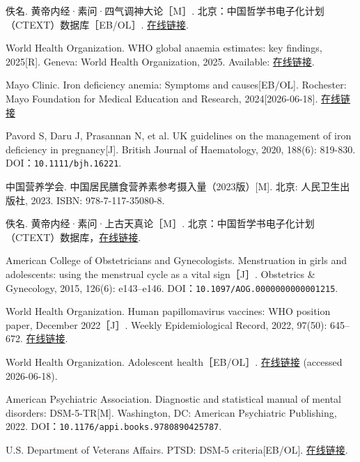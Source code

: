 \begin{enumerate}[label={[Q\arabic*]},leftmargin=*]
  \item 佚名. 黄帝内经·素问·四气调神大论［M］. 北京：中国哲学书电子化计划（CTEXT）数据库［EB/OL］. \href{https://ctext.org/huangdi-neijing/si-qi-diao-shen-da-lun/zh}{在线链接}.
  \item World Health Organization. WHO global anaemia estimates: key findings, 2025[R]. Geneva: World Health Organization, 2025. Available: \href{https://www.who.int/publications/i/item/9789240113930}{在线链接}.
  \item Mayo Clinic. Iron deficiency anemia: Symptoms and causes[EB/OL]. Rochester: Mayo Foundation for Medical Education and Research, 2024[2026-06-18]. \href{https://www.mayoclinic.org/diseases-conditions/iron-deficiency-anemia/symptoms-causes/syc-20355034}{在线链接}
  \item Pavord S, Daru J, Prasannan N, et al. UK guidelines on the management of iron deficiency in pregnancy[J]. British Journal of Haematology, 2020, 188(6): 819-830. DOI：\nolinkurl{10.1111/bjh.16221}.
  \item 中国营养学会. 中国居民膳食营养素参考摄入量（2023版）[M]. 北京: 人民卫生出版社, 2023. ISBN: 978-7-117-35080-8.
  \item 佚名. 黄帝内经·素问·上古天真论［M］. 北京：中国哲学书电子化计划（CTEXT）数据库，\href{https://ctext.org/huangdi-neijing/shang-gu-tian-zhen-lun/zh}{在线链接}.
  \item American College of Obstetricians and Gynecologists. Menstruation in girls and adolescents: using the menstrual cycle as a vital sign［J］. Obstetrics \& Gynecology, 2015, 126(6): e143–e146. DOI：\nolinkurl{10.1097/AOG.0000000000001215}.
  \item World Health Organization. Human papillomavirus vaccines: WHO position paper, December 2022［J］. Weekly Epidemiological Record, 2022, 97(50): 645–672. \href{https://www.who.int/publications/i/item/who-wer9750-645-672}{在线链接}.
  \item World Health Organization. Adolescent health［EB/OL］. \href{https://www.who.int/health-topics/adolescent-health/}{在线链接} (accessed 2026-06-18).
  \item American Psychiatric Association. Diagnostic and statistical manual of mental disorders: DSM-5-TR[M]. Washington, DC: American Psychiatric Publishing, 2022. DOI：\nolinkurl{10.1176/appi.books.9780890425787}.
  \item U.S. Department of Veterans Affairs. PTSD: DSM-5 criteria[EB/OL]. \href{https://www.ptsd.va.gov/professional/treat/essentials/dsm5_ptsd.asp}{在线链接}.

\end{enumerate}
